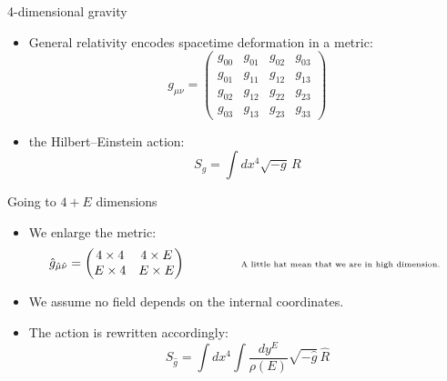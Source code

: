 \documentclass{beamer}
\begin{document}
\begin{frame}{4-dimensional gravity}

    \begin{itemize}
     \item General relativity encodes spacetime deformation in a metric:
    \begin{equation*}
        g_{\mu \nu} = \begin{pmatrix}
            g_{00} & g_{01} & g_{02} & g_{03} \\
            g_{01} & g_{11} & g_{12} & g_{13} \\
            g_{02} & g_{12} & g_{22} & g_{23}\\
            g_{03} & g_{13} & g_{23} & g_{33}  
        \end{pmatrix}
    \end{equation*} \pause
    \item  the Hilbert--Einstein action:
    \begin{equation*}
      \boxed{  S_{g} = \int dx^4 \sqrt{-g}\, R}
    \end{equation*}
\end{itemize}\pause
{}
\end{frame}
\begin{frame}{Going to $4+E$ dimensions}
    \begin{itemize}
        \item We enlarge the metric:\\
    \begin{equation*}
           \hat g_{\hat\mu \hat\nu} = \begin{pmatrix}
          4 \times 4  & 4 \times E  \\  E \times 4  & E \times E
        \end{pmatrix}
    \quad \quad \quad \quad \text{ \fontsize{6}{7}\selectfont A little hat mean that we are in high dimension. \normalsize}
    \end{equation*}
    
        \item We assume no field depends on the internal coordinates.
        \item The action is rewritten accordingly:
        \begin{equation*}
            S_{\hat g} = \int dx^4 \int \frac{dy^E}{\rho(E)} \sqrt{- \hat g} \, \hat R
        \end{equation*}
    \end{itemize}
\end{frame}
\end{document}
